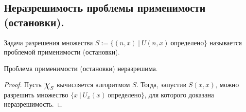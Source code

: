 \subsection{Неразрешимость проблемы применимости (остановки).}

\begin{definition}
  Задача разрешения множества $S := \{ (n,x) \> | \> U(n,x) \> \textit{определено} \}$ называется проблемой применимости (остановки).
\end{definition}

\begin{theorem}
  Проблема применимости (остановки) неразрешима.
  \begin{proof}
    Пусть $\mbox{\Large$\chi$}_S$ вычисляется алгоритмом $S$. Тогда, запустив $S(x,x)$, можно разрешить множество $\{x \> | \> U_x(x) \> \textit{определено} \}$, для которого доказана неразрешимость.
  \end{proof}
\end{theorem}